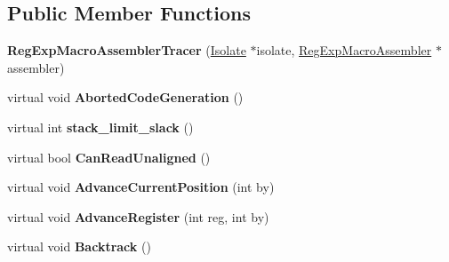 \subsection*{Public Member Functions}
\begin{DoxyCompactItemize}
\item 
{\bfseries Reg\+Exp\+Macro\+Assembler\+Tracer} (\hyperlink{classv8_1_1internal_1_1_isolate}{Isolate} $\ast$isolate, \hyperlink{classv8_1_1internal_1_1_reg_exp_macro_assembler}{Reg\+Exp\+Macro\+Assembler} $\ast$assembler)\hypertarget{classv8_1_1internal_1_1_reg_exp_macro_assembler_tracer_a5088178e9104eec2f5336b04977cbde5}{}\label{classv8_1_1internal_1_1_reg_exp_macro_assembler_tracer_a5088178e9104eec2f5336b04977cbde5}

\item 
virtual void {\bfseries Aborted\+Code\+Generation} ()\hypertarget{classv8_1_1internal_1_1_reg_exp_macro_assembler_tracer_abbb4e9c10172bd9625bb7606112cbc22}{}\label{classv8_1_1internal_1_1_reg_exp_macro_assembler_tracer_abbb4e9c10172bd9625bb7606112cbc22}

\item 
virtual int {\bfseries stack\+\_\+limit\+\_\+slack} ()\hypertarget{classv8_1_1internal_1_1_reg_exp_macro_assembler_tracer_a4f68f899c4c4e9a8f5c4bbb12d33dddb}{}\label{classv8_1_1internal_1_1_reg_exp_macro_assembler_tracer_a4f68f899c4c4e9a8f5c4bbb12d33dddb}

\item 
virtual bool {\bfseries Can\+Read\+Unaligned} ()\hypertarget{classv8_1_1internal_1_1_reg_exp_macro_assembler_tracer_ad6b17a789c51283469c82eefec821b7f}{}\label{classv8_1_1internal_1_1_reg_exp_macro_assembler_tracer_ad6b17a789c51283469c82eefec821b7f}

\item 
virtual void {\bfseries Advance\+Current\+Position} (int by)\hypertarget{classv8_1_1internal_1_1_reg_exp_macro_assembler_tracer_a5313f22d15c95a101780bb7a47e98611}{}\label{classv8_1_1internal_1_1_reg_exp_macro_assembler_tracer_a5313f22d15c95a101780bb7a47e98611}

\item 
virtual void {\bfseries Advance\+Register} (int reg, int by)\hypertarget{classv8_1_1internal_1_1_reg_exp_macro_assembler_tracer_a70362adbf72adba283482916fbc43203}{}\label{classv8_1_1internal_1_1_reg_exp_macro_assembler_tracer_a70362adbf72adba283482916fbc43203}

\item 
virtual void {\bfseries Backtrack} ()\hypertarget{classv8_1_1internal_1_1_reg_exp_macro_assembler_tracer_a810bfb389dc17649b5bd44695b9d3c1f}{}\label{classv8_1_1internal_1_1_reg_exp_macro_assembler_tracer_a810bfb389dc17649b5bd44695b9d3c1f}


\end{DoxyCompactItemize}
